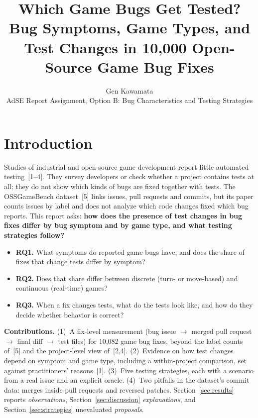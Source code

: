 \documentclass[10pt,twocolumn,a4paper]{article}
\title{\Large\bfseries Which Game Bugs Get Tested?\\[2pt]
\large Bug Symptoms, Game Types, and Test Changes in 10,000 Open-Source Game Bug Fixes}
\author{Gen Kawamata\\[2pt]
\small AdSE Report Assignment, Option B: Bug Characteristics and Testing Strategies}
\date{}
\newcommand{\para}[1]{\par\smallskip\noindent\textbf{#1}\enspace}
\begin{document}
\maketitle

\section{Introduction}

Studies of industrial and open-source game development report little automated testing~[1--4].
They survey developers or check whether a project contains tests at all; they do not show which kinds of bugs are fixed together with tests.
The OSSGameBench dataset~[5] links issues, pull requests and commits, but its paper counts issues by label and does not analyze which code changes fixed which bug reports.
This report asks: \textbf{how does the presence of test changes in bug fixes differ by bug symptom and by game type, and what testing strategies follow?}

\begin{itemize}
\item \textbf{RQ1.} What symptoms do reported game bugs have, and does the share of fixes that change tests differ by symptom?
\item \textbf{RQ2.} Does that share differ between discrete (turn- or move-based) and continuous (real-time) games?
\item \textbf{RQ3.} When a fix changes tests, what do the tests look like, and how do they decide whether behavior is correct?
\end{itemize}

\para{Contributions.}
(1)~A fix-level measurement (bug issue $\rightarrow$ merged pull request $\rightarrow$ final diff $\rightarrow$ test files) for 10,082 game bug fixes, beyond the label counts of~[5] and the project-level view of~[2,4].
(2)~Evidence on how test changes depend on symptom and game type, including a within-project comparison, set against practitioners' reasons~[1].
(3)~Five testing strategies, each with a scenario from a real issue and an explicit oracle.
(4)~Two pitfalls in the dataset's commit data: merges inside pull requests and reversed patches.
Section~\ref{sec:results} reports \emph{observations}, Section~\ref{sec:discussion} \emph{explanations}, and Section~\ref{sec:strategies} unevaluated \emph{proposals}.

\end{document}
